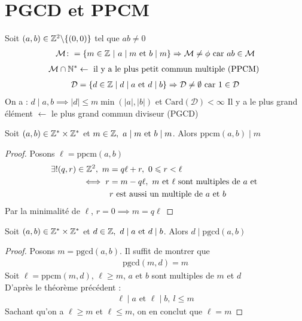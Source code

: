 \section{PGCD et PPCM}
\begin{definition}
Soit $(a, b) \in \mathbb{Z}^2 \backslash \{(0, 0)\}$ tel que $ab \neq 0$
\begin{align*}
\mathcal{M} \colon = \left\{ m \in \mathbb{Z} \ | \ a \mid m \text{ et } b \mid m \right\} \Rightarrow \mathcal{M} \neq \phi \text{ car } ab \in \mathcal{M}
\end{align*}
\begin{align*}
\mathcal{M} \cap \mathbb{N}^* \leftarrow \text{ il y a le plus petit commun multiple (PPCM) }
\end{align*}
\begin{align*}
\mathcal{D} = \left\{ d \in \mathbb{Z} \mid d \mid a \text{ et } d \mid b \right\} \Rightarrow \mathcal{D} \neq \emptyset \text{ car } 1 \in \mathcal{D}
\end{align*}
On a : $d \mid a, b \implies |d| \leq m \min (|a|, |b|)$ et $\mathrm{Card}(\mathcal{D}) < \infty$
Il y a le plus grand élément $\leftarrow$ le plus grand commun diviseur (PGCD)
\end{definition}

\begin{theoreme}[PPCM]
Soit $(a, b) \in \mathbb{Z}^* \times \mathbb{Z}^*$ et $m \in \mathbb{Z},\ a \mid m \text{ et } b \mid m$. Alors $\mathrm{ppcm}(a, b) \mid m$
\end{theoreme}

\begin{proof}
Posons $\ell = \mathrm{ppcm}(a, b)$
\begin{align*}
\exists ! (q, r) \in \mathbb{Z}^2, \ m &= q\ell + r,\ 0 \leqslant r < \ell \\
\iff r &= m - q\ell,\ m \text{ et } \ell \text{ sont multiples de } a \text{ et } 
\\
&r \text{ est aussi un multiple de } a \text{ et } b
\end{align*}
Par la minimalité de $\ell$, $r = 0 \implies m = q \ell$
\end{proof}

\begin{theoreme}[PGCD]
Soit $(a, b) \in \mathbb{Z}^* \times \mathbb{Z}^*$ et $d \in \mathbb{Z},\ d \mid a \text{ et } d \mid b$. Alors $d \mid \mathrm{pgcd}(a, b)$
\end{theoreme}

\begin{proof}
Posons $m = \mathrm{pgcd}(a, b)$. Il suffit de montrer que 
\begin{align*}
\mathrm{pgcd}(m, d) = m
\end{align*}
Soit $\ell = \mathrm{ppcm}(m ,d)$, $\ell \geq m$, $a$ et $b$ sont multiples de $m$ et $d$
\\
D'après le théorème précédent : 
\begin{align*}
\ell \mid a \text{ et } \ell \mid b, \ l \leq m
\end{align*}
Sachant qu'on a $\ell \geq m$ et $\ell \leq m$, on en conclut que $\ell = m$
\end{proof}

